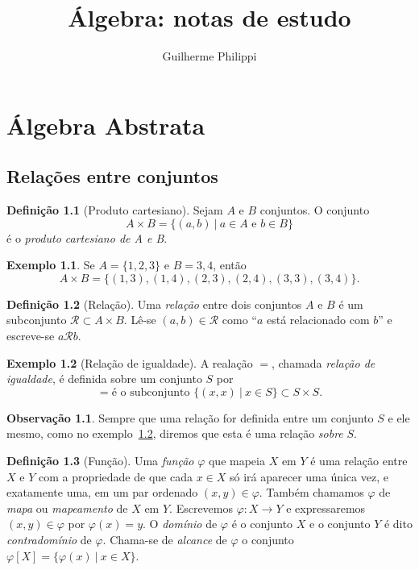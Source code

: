 \documentclass[a4paper,12pt]{report}
\title{Álgebra: notas de estudo}
\author{Guilherme Philippi}
\theoremstyle{plain}
\theoremstyle{definition}
\newtheorem{definicao}{Definição}[section]
\newtheorem{observacao}{Observação}[section]
\newtheorem{exemplo}{Exemplo}[section]
\begin{document}
\maketitle
\tableofcontents

\chapter{Álgebra Abstrata}

\section{Relações entre conjuntos}

\begin{definicao}[Produto cartesiano]
	Sejam $A$ e $B$ conjuntos. O conjunto $$A\times B = \{(a,b) \ | \ a\in A \text{ e } b\in B\}$$
	é o \emph{produto cartesiano de A e B}.
\end{definicao}

\begin{exemplo}
	Se $A = \{1,2,3\}$ e $B = {3,4}$, então $$A\times B = \{(1,3),(1,4),(2,3),(2,4),(3,3),(3,4)\}.$$
\end{exemplo}

\begin{definicao}[Relação]
	Uma	\emph{relação} entre dois conjuntos $A$ e $B$ é um subconjunto $\mathcal{R}\subset A\times B$. Lê-se $(a,b) \in \mathcal{R}$ como ``$a$ está relacionado com $b$'' e escreve-se $a\mathcal{R}b$.
\end{definicao}

\begin{exemplo}[Relação de igualdade]\label{ex:igualdade}
	A realação $=$, chamada \emph{relação de igualdade}, é definida sobre um conjunto $S$ por $$= \text{é o subconjunto } \{(x,x) \ |\ x\in S\}\subset S\times S.$$
\end{exemplo}

\begin{observacao}
	Sempre que uma relação for definida entre um conjunto $S$ e ele mesmo, como no exemplo~\ref{ex:igualdade}, diremos que esta é uma relação \emph{sobre} $S$.
\end{observacao}

\begin{definicao}[Função]
		Uma \emph{função} $\varphi$ que mapeia $X$ em $Y$ é uma relação entre $X$ e $Y$ com a propriedade de que cada $x\in X$ só irá aparecer uma única vez, e exatamente uma, em um par ordenado $(x,y)\in \varphi$. Também chamamos $\varphi$ de \emph{mapa} ou \emph{mapeamento} de $X$ em $Y$. Escrevemos $\varphi: X\longrightarrow Y$ e expressaremos $(x,y)\in\varphi$ por $\varphi(x) = y$. O \emph{domínio} de $\varphi$ é o conjunto $X$ e o conjunto $Y$ é dito \emph{contradomínio} de $\varphi$. Chama-se de \emph{alcance} de $\varphi$ o conjunto $\varphi[X] = \{\varphi(x)\ | \ x \in X\}.$
\end{definicao}
\end{document}
